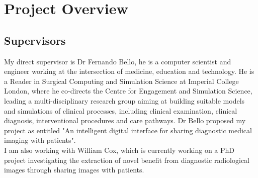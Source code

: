 \documentclass[12pt,twoside]{article}
\date{Juin 2018}
\begin{document}






\clearpage{\pagestyle{empty}\cleardoublepage}

\tableofcontents 


\clearpage{\pagestyle{empty}\cleardoublepage}
\setcounter{page}{1}
\fancyhead[LE,RO]{\slshape \rightmark}
\fancyhead[LO,RE]{\slshape \leftmark}

\section{Project Overview}

\subsection{Supervisors}

My direct supervisor is Dr Fernando Bello, he is a computer scientist and engineer working at the intersection of medicine, education and technology. He is a Reader in Surgical Computing and Simulation Science at Imperial College London, where he co-directs the Centre for Engagement and Simulation Science, leading a multi-disciplinary research group aiming at building suitable models and simulations of clinical processes, including clinical examination, clinical diagnosis, interventional procedures and care pathways.
Dr Bello proposed my project as entitled "An intelligent digital interface for sharing diagnostic medical imaging with patients".\\

I am also working with William Cox, which is currently working on a PhD project investigating the extraction of novel benefit from diagnostic radiological images through sharing images with patients.\\ 
\end{document}
